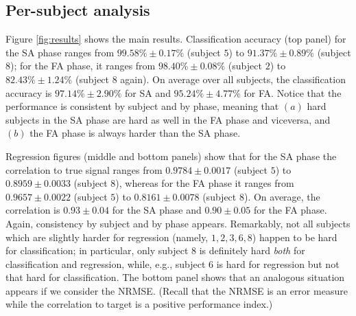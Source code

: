 \documentclass[10pt]{bmc_article}
\def\texttt{[image: ]}
\newenvironment{bmcformat}
  {\begin{raggedright}\baselineskip20pt\sloppy\setboolean{publ}{false}}
  {\end{raggedright}\baselineskip20pt\sloppy}
\begin{document}
\begin{bmcformat}
\subsection*{Per-subject analysis}


Figure \ref{fig:results} shows the main results. Classification
accuracy (top panel) for the SA phase ranges
from $99.58\% \pm 0.17\%$ (subject $5$) to $91.37\% \pm 0.89\%$ (subject $8$);
for the FA phase, it ranges
from $98.40\% \pm 0.08\%$ (subject $2$) to $82.43\% \pm 1.24\%$ (subject $8$ again).
On average over all subjects, the classification accuracy is
$97.14\% \pm 2.90\%$ for SA and $95.24\% \pm 4.77\%$ for FA.
Notice that the performance is
consistent by subject and by phase, meaning that $(a)$ hard subjects
in the SA phase are hard as well in the FA phase and viceversa, and
$(b)$ the FA phase is always harder than the SA phase.

Regression figures (middle and bottom panels) show that for the SA phase
the correlation to true signal ranges from
$0.9784 \pm 0.0017$ (subject $5$) to $0.8959 \pm 0.0033$ (subject $8$),
whereas for the FA phase it ranges from
$0.9657 \pm 0.0022$ (subject $5$) to $0.8161 \pm 0.0078$ (subject $8$).
On average, the correlation is $0.93 \pm 0.04$ for the SA phase and
$0.90 \pm 0.05$ for the FA phase. Again, consistency by subject and by
phase appears. Remarkably,
not all subjects which are slightly harder for regression (namely,
$1,2,3,6,8$) happen to be hard for classification; in particular, only
subject $8$ is definitely hard \emph{both} for classification and
regression, while, e.g., subject $6$ is hard for regression but not
that hard for classification. The bottom panel shows that an analogous
situation appears if we consider the NRMSE. (Recall that the NRMSE is
an error measure while the correlation to target is a positive performance
index.)


\end{bmcformat}
\end{document}
